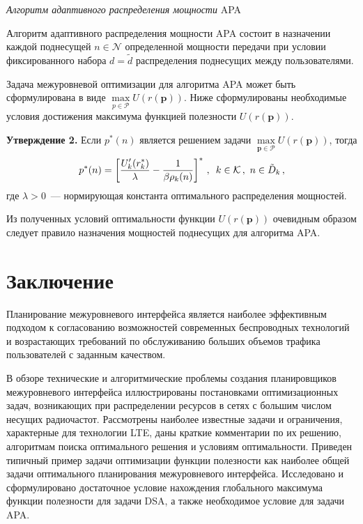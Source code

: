 \begin{multicols}{2}
\medskip

\noindent
\textit{Алгоритм адаптивного распределения мощности} APA

\smallskip

     Алгоритм адаптивного распределения мощ\-ности APA состоит в назначении 
каждой поднесущей $n\in \mathcal{N}$ определенной мощности передачи при условии 
фиксированного набора $d=\tilde{d}$ распределения поднесущих между пользователями.
     
  Задача межуровневой оптимизации для алгоритма APA может быть сформулирована 
в виде $\max\limits_{p\in \mathcal{P}} U(r(\mathbf{p}))$. Ниже сформулированы 
необходимые условия достижения максимума функцией полезности $U(r(\mathbf{p}))$.
  
  \medskip
  
  \noindent
\textbf{Утверждение 2.} Если $p^*(n)$  является решением задачи 
$\max\limits_{\mathbf{p}\in \mathcal{P}} U(r(\mathbf{p}))$, тогда
$$
p^*(n)=\left[ \displaystyle\frac{\displaystyle U^\prime_k(r^*_k)\mathstrut}{\displaystyle \lambda\mathstrut}-\displaystyle\frac{\displaystyle 1\mathstrut}{\displaystyle \beta \rho_k(n)\mathstrut}\right]^*\,,\enskip k\in 
\mathcal{K}\,,\ n\in \tilde{D}_k\,,
$$
где $\lambda>0$~--- нормирующая константа оптимального распределения мощностей.
     
     Из полученных условий оптимальности функции $U(r(\mathbf{p}))$ очевидным 
образом следует правило назначения мощностей поднесущих для алгоритма APA.

\section{Заключение}
  
  Планирование межуровневого интерфейса является наиболее эффективным подходом к 
согласованию возможностей современных беспроводных технологий и возрастающих 
требований по обслуживанию больших объемов трафика пользователей с заданным 
качеством. 
  
  В обзоре технические и алгоритмические проблемы создания планировщиков 
межуровневого интерфейса иллюстрированы постановками оптимизационных задач, 
возникающих при распределении ресурсов в сетях с большим числом несущих 
радиочастот. Рассмотрены наиболее известные задачи и ограничения, характерные для 
технологии LTE, даны краткие комментарии по их решению, алгоритмам поиска 
оптимального решения и условиям оптимальности. Приведен типичный пример задачи 
оптимизации функции полезности как наиболее общей задачи оптимального 
планирования межуровневого интерфейса. Исследовано и сформулировано достаточное 
условие нахождения глобального максимума функции полезности для задачи DSA, а 
также необходимое условие для задачи APA.


\end{multicols}
